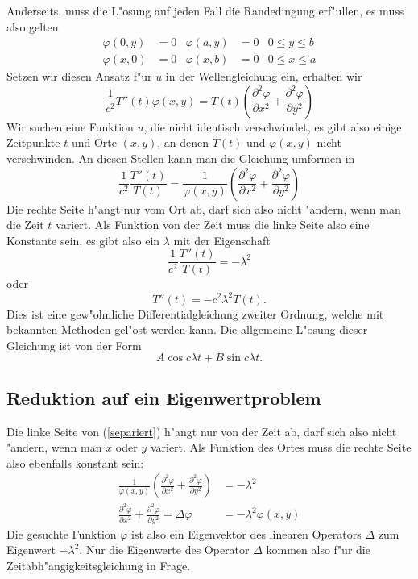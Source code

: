 Anderseits, muss die L"osung auf jeden Fall die Randedingung erf"ullen,
es muss also gelten
\begin{align*}
\varphi(0,y)&=0&\varphi(a,y)&=0&0\le y\le b\\
\varphi(x,0)&=0&\varphi(x,b)&=0&0\le x\le a
\end{align*}
Setzen wir diesen Ansatz f"ur $u$ in der Wellengleichung ein,
erhalten wir
\[
\frac1{c^2}T''(t)\varphi(x,y)=T(t)\left(
\frac{\partial^2\varphi}{\partial x^2}
+
\frac{\partial^2\varphi}{\partial y^2}
\right)
\]
Wir suchen eine Funktion $u$, die nicht identisch verschwindet,
es gibt also einige Zeitpunkte $t$ und Orte $(x,y)$, an denen $T(t)$
und $\varphi(x,y)$ nicht verschwinden. An diesen Stellen kann man die
Gleichung umformen in
\begin{equation}
\frac1{c^2}\frac{T''(t)}{T(t)}
= \frac1{\varphi(x,y)}\left( \frac{\partial^2\varphi}{\partial x^2}
+ \frac{\partial^2\varphi}{\partial y^2} \right)
\label{separiert}
\end{equation}
Die rechte Seite h"angt nur
vom Ort ab, darf sich also nicht "andern, wenn man die Zeit $t$ variert.
Als Funktion von der Zeit muss die linke Seite also eine Konstante sein,
es gibt also ein $\lambda$ mit der Eigenschaft
\[
\frac1{c^2}\frac{T''(t)}{T(t)}=-\lambda^2
\]
oder
\[
T''(t)=-c^2\lambda^2 T(t).
\]
Dies ist eine gew"ohnliche Differentialgleichung zweiter Ordnung, welche mit
bekannten Methoden gel"ost werden kann.
Die allgemeine L"osung dieser Gleichung ist von der Form
\[
A\cos c\lambda t+B\sin c\lambda t.
\]

\subsection{Reduktion auf ein Eigenwertproblem}
Die linke Seite von (\ref{separiert}) h"angt nur von der Zeit ab, darf sich
also nicht "andern, wenn man $x$ oder $y$ variert. Als Funktion des Ortes
muss die rechte Seite also ebenfalls konstant sein:
\begin{align*}
\frac1{\varphi(x,y)}\left(
\frac{\partial^2\varphi}{\partial x^2}
+
\frac{\partial^2\varphi}{\partial y^2}
\right)&=-\lambda^2\\
\frac{\partial^2\varphi}{\partial x^2}
+
\frac{\partial^2\varphi}{\partial y^2}
=\Delta\varphi
&=-\lambda^2
\varphi(x,y)
\end{align*}
Die gesuchte Funktion $\varphi$ ist also ein Eigenvektor des linearen
Operators $\Delta$ zum Eigenwert $-\lambda^2$.
Nur die Eigenwerte des Operator $\Delta$ kommen also f"ur die
Zeitabh"angigkeitsgleichung in Frage.


